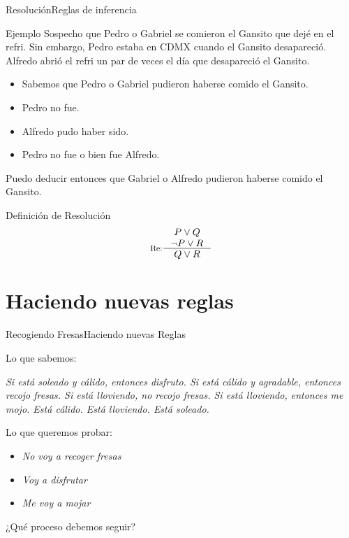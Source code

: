 \documentclass[spanish, c]{beamer}
\begin{document}
\begin{frame}{Resolución}{Reglas de inferencia}

    \begin{exampleblock}{Ejemplo}
        \footnotesize
        Sospecho que Pedro o Gabriel se comieron el Gansito que dejé en el refri.
        Sin embargo, Pedro estaba en CDMX cuando el Gansito desapareció.
        Alfredo abrió el refri un par de veces el día que desapareció el Gansito.

        \begin{itemize}
            \item Sabemos que Pedro o Gabriel pudieron haberse comido el Gansito.
            \item Pedro no fue.
            \item Alfredo pudo haber sido.
            \item Pedro no fue o bien fue Alfredo.
        \end{itemize}

        Puedo deducir entonces que Gabriel o Alfredo pudieron haberse comido el Gansito.
    \end{exampleblock}

    \begin{block}{Definición de Resolución}
        $$\inference[Re:]{P \vee  Q \\  \neg P \vee R}{Q \vee R}$$
    \end{block}
\end{frame}

\section{Haciendo nuevas reglas}

\begin{frame}{Recogiendo Fresas}{Haciendo nuevas Reglas}

    Lo que sabemos:

    \begin{center}
        \textit{
        Si está soleado y cálido, entonces disfruto.
        Si está cálido y agradable, entonces recojo fresas.
        Si está lloviendo, no recojo fresas.
        Si está lloviendo, entonces me mojo.
        Está cálido.
        Está lloviendo.
        Está soleado.}
    \end{center} \pause
    \bigskip
    Lo que queremos probar:
    \begin{itemize}
        \item \textit{No voy a recoger fresas}
        \item \textit{Voy a disfrutar}
        \item \textit{Me voy a mojar}
    \end{itemize}
     \pause
    \bigskip

    ¿Qué proceso debemos seguir?
\end{frame}
\end{document}
